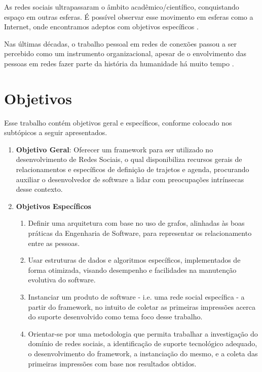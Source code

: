 As redes sociais ultrapassaram o âmbito acadêmico/científico, conquistando espaço em outras esferas. É possível observar esse movimento em esferas como a Internet, onde encontramos adeptos com objetivos específicos \cite{Tomae:Alcara:Chiara:2005}.

Nas últimas décadas, o trabalho pessoal em redes de conexões passou a ser percebido como um instrumento organizacional, apesar de o envolvimento das pessoas em redes fazer parte da história da humanidade há muito tempo \cite{Tomae:Alcara:Chiara:2005}.


\section*{Objetivos}

Esse trabalho contém objetivos geral e específicos, conforme colocado nos subtópicos a seguir apresentados.

\begin{enumerate}
	\item \textbf{Objetivo Geral}: Oferecer um framework para ser utilizado no desenvolvimento de Redes Sociais, o qual disponibiliza recursos gerais de relacionamentos e específicos de definição de trajetos e agenda, procurando auxiliar o desenvolvedor de software a lidar com preocupações intrínsecas desse contexto.

	\item \textbf{Objetivos Específicos}
	\begin{enumerate}
		\item Definir uma arquitetura com base no uso de grafos, alinhadas às boas práticas da Engenharia de Software, para representar os relacionamento entre as pessoas.
		\item Usar estruturas de dados e algoritmos específicos, implementados de forma otimizada, visando desempenho e facilidades na manutenção evolutiva do software.
		\item Instanciar um produto de software - i.e. uma rede social específica - a partir do framework, no intuito de coletar as primeiras impressões acerca do suporte desenvolvido como tema foco desse trabalho.
		\item Orientar-se por uma metodologia que permita trabalhar a investigação do domínio de redes sociais, a identificação de suporte tecnológico adequado, o desenvolvimento do framework, a instanciação do mesmo, e a coleta das primeiras impressões com base nos resultados obtidos.
	\end{enumerate}
\end{enumerate}

